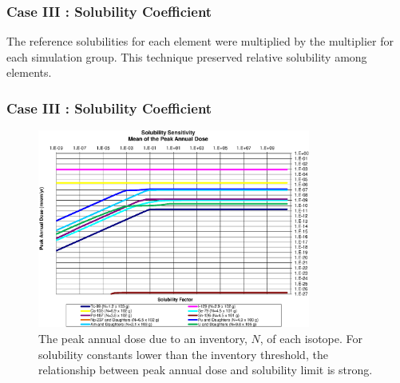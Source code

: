 
\begin{frame}[c]
  \frametitle{Case III : Solubility Coefficient}
The reference solubilities for each element were multiplied by the multiplier 
for each simulation group. This technique preserved relative solubility among 
  elements. 


\end{frame}

\begin{frame}[c]
  \frametitle{Case III : Solubility Coefficient}


\begin{figure}[ht]
\centering
\includegraphics[width=0.8\textwidth]{Solubility/Solubility_Summary_SolFactor.eps}
\caption{
The peak annual dose due to an inventory, $N$, of each isotope.
For solubility constants lower than the inventory threshold, the relationship between peak 
annual dose and solubility limit is strong.}
\label{fig:SolSumFactor}
\end{figure}
\end{frame}

